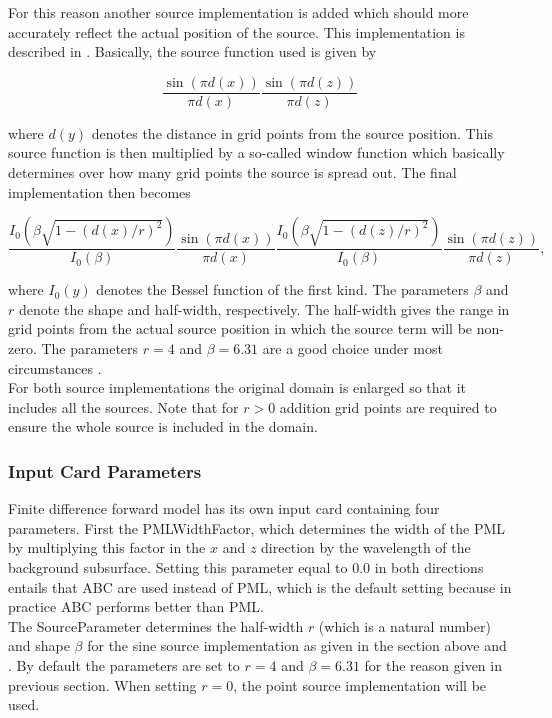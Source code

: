 \documentclass[10pt,a4paper]{article}
\begin{document}
For this reason another source implementation is added which should more accurately reflect the actual position of the source. This implementation is described in \cite{Hicks}. Basically, the source function used is given by

\begin{equation}
	\frac{\sin(\pi d(x))}{\pi d(x)}\frac{\sin(\pi d(z))}{\pi d(z)}
\end{equation}

where $d(y)$ denotes the distance in grid points from the source position. This source function is then multiplied by a so-called window function which basically determines over how many grid points the source is spread out. The final implementation then becomes

\begin{equation}
	\frac{I_0(\beta \sqrt{1-(d(x)/r)^2})}{I_0(\beta)}\frac{\sin(\pi d(x))}{\pi d(x)}\frac{I_0(\beta \sqrt{1-(d(z)/r)^2})}{I_0(\beta)}\frac{\sin(\pi d(z))}{\pi d(z)},
\end{equation}

where $I_0(y)$ denotes the Bessel function of the first kind. The parameters $\beta$ and $r$ denote the shape and half-width, respectively. The half-width gives the range in grid points from the actual source position in which the source term will be non-zero. The parameters $r=4$ and $\beta=6.31$ are a good choice under most circumstances \cite{Hicks}.\\

For both source implementations the original domain is enlarged so that it includes all the sources. Note that for $r>0$ addition grid points are required to ensure the whole source is included in the domain.

\subsubsection{Input Card Parameters} \label{sec:FDimplementation}
Finite difference forward model has its own input card containing four parameters. First the PMLWidthFactor, which determines the width of the PML by multiplying this factor in the $x$ and $z$ direction by the wavelength of the background subsurface. Setting this parameter equal to $0.0$ in both directions entails that ABC are used instead of PML, which is the default setting because in practice ABC performs better than PML.\\

The SourceParameter determines the half-width $r$ (which is a natural number) and shape $\beta$ for the sine source implementation as given in the section above and \cite{Hicks}. By default the parameters are set to $r=4$ and $\beta=6.31$ for the reason given in previous section. When setting $r=0$, the point source implementation will be used.
\end{document}
